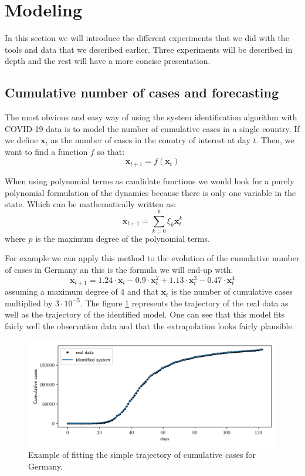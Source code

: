 \documentclass[12pt, letterpaper]{article}
\begin{document}
\section{Modeling}\label{sec:modeling}

In this section we will introduce the different experiments that we did with the tools and data that we described earlier. Three experiments will be described in depth and the rest will have a more concise presentation.

\subsection{Cumulative number of cases and forecasting}

The most obvious and easy way of using the system identification algorithm with COVID-19 data is to model the number of cumulative cases in a single country. If we define $\mathbf{x}_t$ as the number of cases in the country of interest at day $t$. Then, we want to find a function $f$ so that:
$$\mathbf{x}_{t+1} = f(\mathbf{x}_t)$$

When using polynomial terms as candidate functions we would look for a purely polynomial formulation of the dynamics because there is only one variable in the state. 
Which can be mathematically written as:
$$\mathbf{x}_{t+1} = \sum_{k=0}^p \xi_k \mathbf{x}_t^k$$
where $p$ is the maximum degree of the polynomial terms.

For example we can apply this method to the evolution of the cumulative number of cases in Germany an this is the formula we will end-up with:
$$\mathbf{x}_{t+1} = 1.24 \cdot \mathbf{x}_t - 0.9 \cdot \mathbf{x}_t^2 + 1.13 \cdot \mathbf{x}_t^3 - 0.47 \cdot \mathbf{x}_t^4$$
assuming a maximum degree of 4 and that $\mathbf{x}_{t}$ is the number of cumulative cases multiplied by $3 \cdot 10^{-5}$. 
The figure \ref{fig:germany} represents the trajectory of the real data as well as the trajectory of the identified model. 
One can see that this model fits fairly well the observation data and that the extrapolation looks fairly plausible. 


\begin{figure}[h]
\centering
\includegraphics[scale=0.78]{germany.png}
\caption{Example of fitting the simple trajectory of cumulative cases for Germany.}
\label{fig:germany}
\end{figure}
\end{document}

